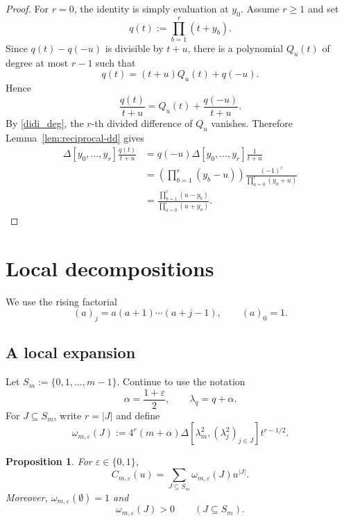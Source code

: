 \documentclass[10pt,a4paper]{amsart}
\newtheorem{Proposition}[Theorem]{Proposition}
\theoremstyle{definition}
\newcommand{\DD}{\Delta}
\begin{document}
\begin{proof}
For $r=0$, the identity is simply evaluation at $y_0$.  Assume $r\ge1$ and set
\[
q(t):=\prod_{b=1}^r(t+y_b).
\]
Since $q(t)-q(-u)$ is divisible by $t+u$, there is a polynomial $Q_u(t)$
of degree at most $r-1$ such that
\[
q(t)=(t+u)Q_u(t)+q(-u).
\]
Hence
\[
\frac{q(t)}{t+u}
=
Q_u(t)+\frac{q(-u)}{t+u}.
\]
By \eqref{didi_deg}, the $r$-th divided difference of $Q_u$ vanishes.  Therefore
Lemma~\ref{lem:reciprocal-dd} gives
\[
\begin{aligned}
\DD[y_0,\ldots,y_r]\frac{q(t)}{t+u}
&=q(-u)\DD[y_0,\ldots,y_r]\frac1{t+u}\\
&=\left(\prod_{b=1}^r(y_b-u)\right)
\frac{(-1)^r}{\prod_{a=0}^r(y_a+u)}\\
&=\frac{\prod_{b=1}^r(u-y_b)}{\prod_{a=0}^r(u+y_a)}.
\end{aligned}
\]
\end{proof}



\section{Local decompositions}\label{sec:local-expansion}

We use the rising factorial
\[
(a)_j=a(a+1)\cdots(a+j-1),
\qquad
(a)_0=1.
\]

\subsection{A local expansion}

Let $S_m:=\{0,1,\ldots,m-1\}$.
Continue to use the notation
\[
\alpha=\frac{1+\varepsilon}{2},
\qquad
\lambda_q=q+\alpha.
\]
For $J\subseteq S_m$, write $r=|J|$ and define
\begin{equation}\label{eq:parity-weight}
\omega_{m,\varepsilon}(J)
:=
4^r(m+\alpha)
\DD[\lambda_m^2,(\lambda_j^2)_{j\in J}]
t^{r-1/2}.
\end{equation}

\begin{Proposition}\label{prop:unified-local-expansion}
For $\varepsilon\in\{0,1\}$,
\[
C_{m,\varepsilon}(u)
=
\sum_{J\subseteq S_m}
\omega_{m,\varepsilon}(J)u^{|J|}.
\]
Moreover, $\omega_{m,\varepsilon}(\emptyset)=1$
and
\[
\omega_{m,\varepsilon}(J)>0
\qquad
(J\subseteq S_m).
\]
\end{Proposition}
\end{document}
